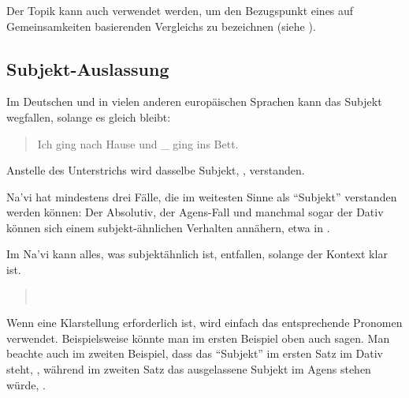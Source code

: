 \subsubsection{} Der Topik kann auch verwendet werden, um den Bezugspunkt eines auf Gemeinsamkeiten basierenden Vergleichs zu bezeichnen (siehe ).

\subsection{Subjekt-Auslassung} \label{subject-dropping}
Im Deutschen und in vielen anderen europäischen Sprachen kann das Subjekt wegfallen, solange es gleich bleibt:

\begin{quotation}
	\noindent Ich ging nach Hause und \_ ging ins Bett.
\end{quotation}

\noindent Anstelle des Unterstrichs wird dasselbe Subjekt, , verstanden.

Na'vi hat mindestens drei Fälle, die im weitesten Sinne als ``Subjekt'' verstanden werden können: Der Absolutiv, der Agens-Fall und manchmal sogar der Dativ können sich einem subjekt-ähnlichen Verhalten annähern, etwa in  .

Im Na'vi kann alles, was subjektähnlich ist, entfallen, solange der Kontext klar ist.

\begin{quotation}
	\noindent{} \\
	\noindent{} 
\end{quotation}

\begin{quotation}
	\noindent{}
	
	\medskip
	\noindent{}
\end{quotation}

\noindent Wenn eine Klarstellung erforderlich ist, wird einfach das entsprechende Pronomen verwendet. Beispielsweise könnte man im ersten Beispiel oben auch  sagen. Man beachte auch im zweiten Beispiel, dass das ``Subjekt'' im ersten Satz im Dativ steht, , während im zweiten Satz das ausgelassene Subjekt im Agens stehen würde, .


